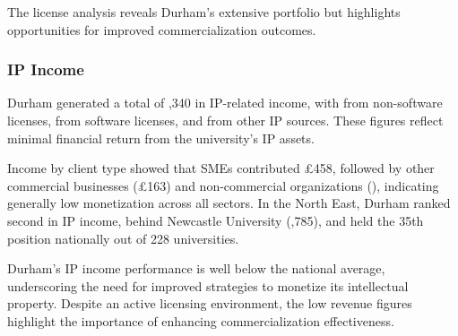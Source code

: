 \documentclass[journal,onecolumn, 10pt,draftclsnofoot]{IEEEtran}
\begin{document}
The license analysis reveals Durham's extensive portfolio but highlights opportunities for improved commercialization outcomes.

\subsubsection{IP Income}

Durham generated a total of ,340 in IP-related income, with  from non-software licenses,  from software licenses, and  from other IP sources. These figures reflect minimal financial return from the university's IP assets.

Income by client type showed that SMEs contributed \pounds 458, followed by other commercial businesses (\pounds 163) and non-commercial organizations (), indicating generally low monetization across all sectors. In the North East, Durham ranked second in IP income, behind Newcastle University (,785), and held the 35th position nationally out of 228 universities.



Durham's IP income performance is well below the national average, underscoring the need for improved strategies to monetize its intellectual property. Despite an active licensing environment, the low revenue figures highlight the importance of enhancing commercialization effectiveness.
\vspace{0.2cm}
\begin{table}[h]
\centering
\caption{IP Income Analysis - Durham University}
\label{tab:ip-income-analysis}
\end{table}
\end{document}
